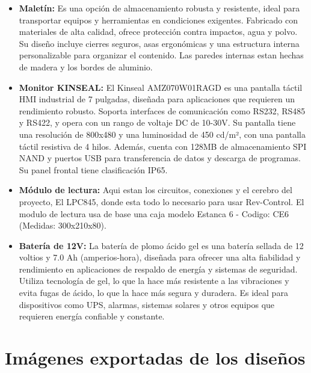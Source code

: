 \begin{itemize}

    \item \textbf{Maletín:} Es una opción de almacenamiento robusta y resistente, ideal para transportar equipos y herramientas en condiciones exigentes. Fabricado con materiales de alta calidad, ofrece protección contra impactos, agua y polvo. Su diseño incluye cierres seguros, asas ergonómicas y una estructura interna personalizable para organizar el contenido. Las paredes internas estan hechas de madera y los bordes de aluminio.
    
    \item \textbf{Monitor KINSEAL:} El Kinseal AMZ070W01RAGD es una pantalla táctil HMI industrial de 7 pulgadas, diseñada para aplicaciones que requieren un rendimiento robusto. Soporta interfaces de comunicación como RS232, RS485 y RS422, y opera con un rango de voltaje DC de 10-30V. Su pantalla tiene una resolución de 800x480 y una luminosidad de 450 cd/m², con una pantalla táctil resistiva de 4 hilos. Además, cuenta con 128MB de almacenamiento SPI NAND y puertos USB para transferencia de datos y descarga de programas. Su panel frontal tiene clasificación IP65.
    
    \item \textbf{Módulo de lectura:} Aqui estan los circuitos, conexiones y el cerebro del proyecto, El LPC845, donde esta todo lo necesario para usar Rev-Control. El modulo de lectura usa de base una caja modelo  Estanca 6 - Codigo: CE6 (Medidas: 300x210x80).
    
    \item \textbf{Batería de 12V:} La batería de plomo ácido gel es una batería sellada de 12 voltios y 7.0 Ah (amperios-hora), diseñada para ofrecer una alta fiabilidad y rendimiento en aplicaciones de respaldo de energía y sistemas de seguridad. Utiliza tecnología de gel, lo que la hace más resistente a las vibraciones y evita fugas de ácido, lo que la hace más segura y duradera. Es ideal para dispositivos como UPS, alarmas, sistemas solares y otros equipos que requieren energía confiable y constante.
    
\end{itemize}



\section{Imágenes exportadas de los diseños}
    
